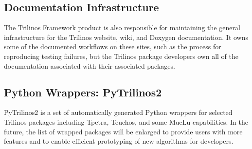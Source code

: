 \subsection{Documentation Infrastructure}

The Trilinos Framework product is also responsible for maintaining the general infrastructure for the Trilinos website, wiki, and Doxygen documentation. It owns some of the documented workflows on these sites, such as the process for reproducing testing failures, but the Trilinos package developers own all of the documentation associated with their associated packages.


\subsection{Python Wrappers: PyTrilinos2}

PyTrilinos2 is a set of automatically generated Python wrappers for selected Trilinos packages including Tpetra, Teuchos, and some MueLu capabilities. In the future, the list of wrapped packages will be enlarged to provide users with more features and to enable efficient prototyping of new algorithms for developers.

